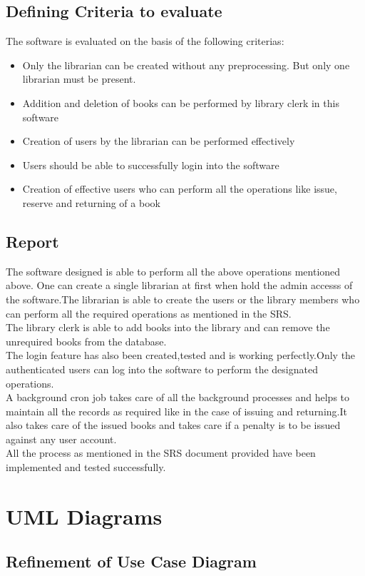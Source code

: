 \documentclass[a4paper]{article}
\begin{document}
\subsection{Defining Criteria to evaluate}
The software is evaluated on the basis of the following criterias:
\begin{itemize}
\item Only the librarian can be created without any preprocessing. But only one librarian must be present.
\item Addition and deletion of books can be performed by library clerk in this software
\item Creation of users by the librarian can be performed effectively
\item Users should be able to successfully login into the software
\item Creation of effective users who can perform all the operations like issue, reserve and returning of a book
\end{itemize}
\subsection{Report}
The software designed is able to perform all the above operations mentioned above. One can create a single librarian at first when hold the admin accesss of the software.The librarian is able to create the users or the library members who can perform all the required operations as mentioned in the SRS.
\\The library clerk is able to add books into the library and can remove the unrequired books from the database.
\\The login feature has also been created,tested and is working perfectly.Only the authenticated users can log into the software to perform the designated operations.
\\A background cron job takes care of all the background processes and helps to maintain all the records as required like in the case of issuing and returning.It also takes care of the issued books and takes care if a penalty is to be issued against any user account.
\\All the process as mentioned in the SRS document provided have been implemented and tested successfully.

\section{UML Diagrams}

\subsection{Refinement of Use Case Diagram}
\end{document}
